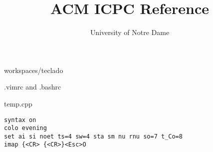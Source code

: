 \documentclass[a4paper,oneside]{article}
\title{ACM ICPC Reference}
\author{University of Notre Dame}
\begin{document}
\maketitle
\thispagestyle{fancy}
\tableofcontents
\newpage

\begin{enumerate*}
 \item workspaces/teclado 
 \item .vimrc and .bashrc
 \item temp.cpp
\end{enumerate*}

\begin{lstlisting}
syntax on
colo evening
set ai si noet ts=4 sw=4 sta sm nu rnu so=7 t_Co=8
imap {<CR> {<CR>}<Esc>O
\end{lstlisting}


\end{document}
